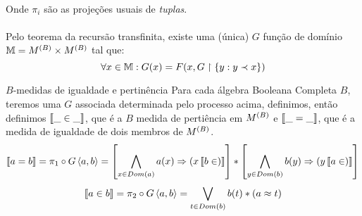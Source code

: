     \paragraph{}
        Onde $\pi_i$ são as projeções usuais de \textit{tuplas}.
    \paragraph{}
        Pelo teorema da recursão transfinita, existe uma (única) $G$ função de domínio $\mathbb{M}=M^{(B)}\times M^{(B)}$ 
        tal que:
    $$\forall x\in\mathbb{M}:G(x) = F(x,G\restriction\SET{y: y \prec x})$$
    \begin{definition}{$B$-medidas de igualdade e pertinência}
        Para cada álgebra Booleana Completa $B$, teremos uma $G$ associada determinada pelo processo acima, definimos,
        então definimos $\left\llbracket\_ \in \_\right\rrbracket$, que é a $B$ medida de pertiência em $M^{(B)}$ e $\left\llbracket\_ = \_\right\rrbracket$, que é a medida de igualdade de 
        dois membros de $M^{(B)}$.
        $$ \Meq{a}{b} = \pi_1 \circ G\TUPLE{a}{b} = \left[\bigwedge_{x\in Dom(a)}a(x)\RAR (x\Min b)\right]*\left[\bigwedge_{y\in Dom(b)}b(y)\RAR (y\Min a)\right]$$
        $$ \Min{a}{b} = \pi_2 \circ G\TUPLE{a}{b} = \bigvee_{t\in Dom(b)} b(t)*(a\approx t)$$
    \end{definition}
